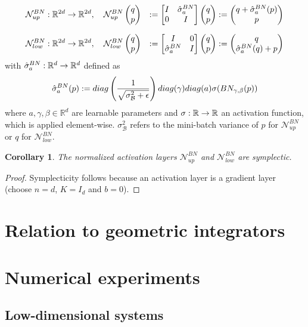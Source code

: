 \documentclass[twoside,a4paper]{article}
\newtheorem{corollary}{Corollary}
\begin{document}
\begin{alignat*}{2}
	\mathcal{N}^{BN}_{up} &: \mathbb{R}^{2d} \to \mathbb{R}^{2d}, \quad
	\mathcal{N}^{BN}_{up} \begin{pmatrix} q \\ p \end{pmatrix} &:= \begin{bmatrix} I & {\hat{\sigma}^{BN}_a} \\ 0 & I \end{bmatrix} \begin{pmatrix} q \\ p \end{pmatrix} := \begin{pmatrix}
		q + \hat{\sigma}^{BN}_a(p) \\
		p
	\end{pmatrix} \\[7pt]
	\mathcal{N}^{BN}_{low} &: \mathbb{R}^{2d} \to \mathbb{R}^{2d}, \quad
	\mathcal{N}^{BN}_{low} \begin{pmatrix} q \\ p \end{pmatrix} &:= \begin{bmatrix} I & 0 \\ {\hat{\sigma}^{BN}_a} & I \end{bmatrix} \begin{pmatrix} q \\ p \end{pmatrix} := \begin{pmatrix}
		q \\
		\hat{\sigma}^{BN}_a(q) + p
	\end{pmatrix}
\end{alignat*}
with $\hat{\sigma}^{BN}_a : \mathbb{R}^d \to \mathbb{R}^d$ defined as
\begin{equation*}
	\hat{\sigma}^{BN}_a(p) := 
	diag\left( \frac{1}{\sqrt{\sigma^2_\mathcal{B} + \epsilon}} \right) diag(\gamma)
	diag(a) \sigma(BN_{\gamma, \beta}(p))
\end{equation*}
where $a, \gamma, \beta \in \mathbb{R}^d$ are learnable parameters and 
$\sigma : \mathbb{R} \to \mathbb{R}$ an activation function,
which is applied element-wise. $\sigma^2_\mathcal{B}$ refers to the mini-batch variance of $p$
for $\mathcal{N}^{BN}_{up}$ or $q$ for $\mathcal{N}^{BN}_{low}$.

\begin{corollary}
	The normalized activation layers $\mathcal{N}^{BN}_{up}$ and $\mathcal{N}^{BN}_{low}$
	are symplectic.
\end{corollary}
\begin{proof}
	Symplecticity follows because an activation layer is a gradient layer
	(choose $n=d$, $K=I_d$ and $b=0$).
\end{proof}

\section{Relation to geometric integrators}

\section{Numerical experiments}

\subsection{Low-dimensional systems}
\end{document}
